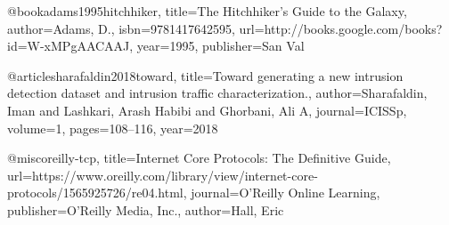 @book{adams1995hitchhiker,
title={The Hitchhiker's Guide to the Galaxy},
author={Adams, D.},
isbn={9781417642595},
url={http://books.google.com/books?id=W-xMPgAACAAJ},
year={1995},
publisher={San Val}
}

@article{sharafaldin2018toward,
title={Toward generating a new intrusion detection dataset and intrusion traffic characterization.},
author={Sharafaldin, Iman and Lashkari, Arash Habibi and Ghorbani, Ali A},
journal={ICISSp},
volume={1},
pages={108--116},
year={2018}
}

@misc{oreilly-tcp, title={Internet Core Protocols: The Definitive Guide}, url={https://www.oreilly.com/library/view/internet-core-protocols/1565925726/re04.html}, journal={O'Reilly Online Learning}, publisher={O'Reilly Media, Inc.}, author={Hall, Eric}}
